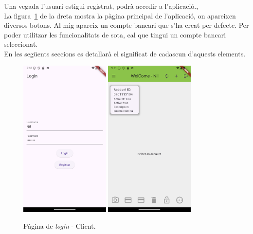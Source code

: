 \documentclass[a4paper,12pt,twoside]{ThesisStyle}
\begin{document}
Una vegada l'usuari estigui registrat, podrà accedir a l'aplicació.,\\

La figura~\ref{fig: Pàgina de login - client} de la dreta mostra la pàgina principal de l'aplicació, on apareixen diversos botons. Al mig apareix un compte bancari que s'ha creat per defecte. Per poder utilitzar les funcionalitats de sota, cal que tingui un compte bancari seleccionat.\\

En les següents seccions es detallarà el significat de cadascun d'aquests elements.

\begin{figure}[h]
    \centering
    \includegraphics[width=0.4\textwidth]{imatges/loginNil.png}
    \includegraphics[width=0.4\textwidth]{imatges/mainPage.png}
    \caption{Pàgina de \textit{login} - Client.}
    \label{fig: Pàgina de login - client}
\end{figure}
\end{document}
